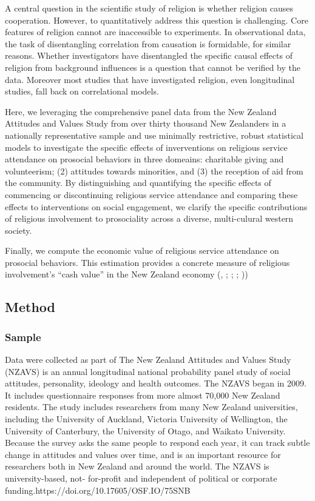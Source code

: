 \documentclass[
  singlecolumn]{article}
\begin{document}
A central question in the scientific study of religion is whether
religion causes cooperation. However, to quantitatively address this
question is challenging. Core features of religion cannot are
inaccessible to experiments. In observational data, the task of
disentangling correlation from causation is formidable, for similar
reasons. Whether investigators have disentangled the specific causal
effects of religion from background influences is a question that cannot
be verified by the data. Moreover most studies that have investigated
religion, even longitudinal studies, fall back on correlational models.

Here, we leveraging the comprehensive panel data from the New Zealand
Attitudes and Values Study from over thirty thousand New Zealanders in a
nationally representative sample and use minimally restrictive, robust
statistical models to investigate the specific effects of inverventions
on religious service attendance on prosocial behaviors in three
domeains: charitable giving and volunteerism; (2) attitudes towards
minorities, and (3) the reception of aid from the community. By
distinguishing and quantifying the specific effects of commencing or
discontinuing religious service attendance and comparing these effects
to interventions on social engagement, we clarify the specific
contributions of religious involvement to prosociality across a diverse,
multi-culural western society.

Finally, we compute the economic value of religious service attendance
on prosocial behaviors. This estimation provides a concrete measure of
religious involvement's ``cash value'' in the New Zealand economy
(,
; ; ;
))

\subsection{Method}\label{method}

\subsubsection{Sample}\label{sample}

Data were collected as part of The New Zealand Attitudes and Values
Study (NZAVS) is an annual longitudinal national probability panel study
of social attitudes, personality, ideology and health outcomes. The
NZAVS began in 2009. It includes questionnaire responses from more
almost 70,000 New Zealand residents. The study includes researchers from
many New Zealand universities, including the University of Auckland,
Victoria University of Wellington, the University of Canterbury, the
University of Otago, and Waikato University. Because the survey asks the
same people to respond each year, it can track subtle change in
attitudes and values over time, and is an important resource for
researchers both in New Zealand and around the world. The NZAVS is
university-based, not- for-profit and independent of political or
corporate funding.https://doi.org/10.17605/OSF.IO/75SNB
\end{document}
